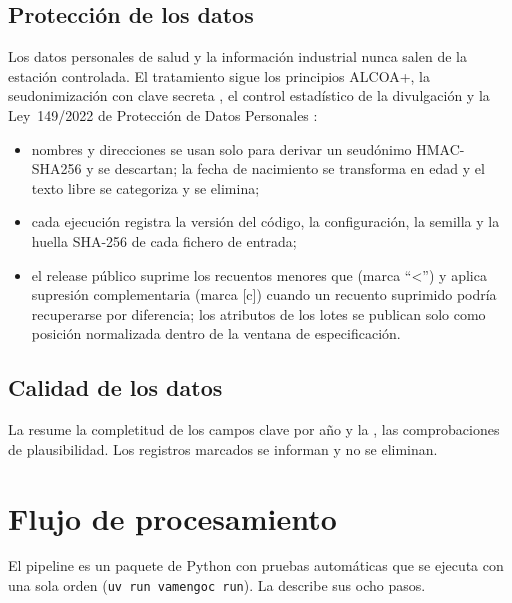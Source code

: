 \documentclass[11pt]{article}
\begin{document}
\subsection{Protección de los datos}
Los datos personales de salud y la información industrial nunca salen de la estación controlada. El
tratamiento sigue los principios ALCOA+, la seudonimización con clave secreta
\citep{ENISA2019,MHRA2018}, el control estadístico de la divulgación \citep{Hundepool2012} y la
Ley~149/2022 de Protección de Datos Personales \citep{Ley149}:
\begin{itemize}[leftmargin=*]
\item nombres y direcciones se usan solo para derivar un seudónimo HMAC-SHA256 y se descartan; la
  fecha de nacimiento se transforma en edad y el texto libre se categoriza y se elimina;
\item cada ejecución registra la versión del código, la configuración, la semilla y la huella
  SHA-256 de cada fichero de entrada;
\item el release público suprime los recuentos menores que \VMinCell{} (marca ``<\VMinCell'') y
  aplica supresión complementaria (marca [c]) cuando un recuento suprimido podría recuperarse por
  diferencia; los atributos de los lotes se publican solo como posición normalizada dentro de la
  ventana de especificación.
\end{itemize}

\subsection{Calidad de los datos}
La  resume la completitud de los campos clave por año y la
, las comprobaciones de plausibilidad. Los registros marcados se informan y
no se eliminan.

\begin{table}[htbp]
\centering\small
\caption{Completitud de los campos clave por año del fichero (\% de registros con el campo
presente).}
\label{tab:completeness}
\POTableCompleteness
\end{table}

\begin{table}[htbp]
\centering\small
\caption{Comprobaciones de plausibilidad: registros marcados en todos los años.}
\label{tab:plausibility}
\POTablePlausibility
\end{table}

\section{Flujo de procesamiento}
El pipeline es un paquete de Python con pruebas automáticas que se ejecuta con una sola orden
(\texttt{uv run vamengoc run}). La  describe sus ocho pasos.
\end{document}
